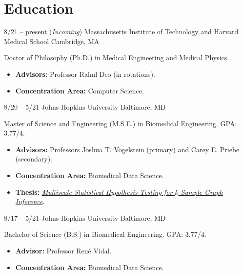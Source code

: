 \section{Education}

\cventry
{8/21 -- present (\textit{Incoming})}
{Massachusetts Institute of Technology and Harvard Medical School}
{}
{Cambridge, MA}
{}
{
Doctor of Philosophy (Ph.D.) in Medical Engineering and Medical Physics.
\begin{itemize}
    \item \textbf{Advisors:} Professor Rahul Deo (in rotations).
    \item \textbf{Concentration Area:} Computer Science.
\end{itemize}
}


\cventry
{8/20 -- 5/21}
{Johns Hopkins University}
{}
{Baltimore, MD}
{}
{
Master of Science and Engineering (M.S.E.) in Biomedical Engineering.
GPA: 3.77/4.
\begin{itemize}
    \item \textbf{Advisors:} Professors Joshua T. Vogelstein (primary) and Carey E. Priebe (secondary).
    \item \textbf{Concentration Area:} Biomedical Data Science.
    \item \textbf{Thesis:} \textit{\href{https://jscholarship.library.jhu.edu/handle/1774.2/64239}{Multiscale Statistical Hypothesis Testing for $k$-Sample Graph Inference}}.
\end{itemize}
}

\cventry
{8/17 -- 5/21}
{Johns Hopkins University}
{}
{Baltimore, MD}
{}
{
Bachelor of Science (B.S.) in Biomedical Engineering.
GPA: 3.77/4.
\begin{itemize}
    \item \textbf{Advisor:} Professor Ren\'{e} Vidal.
    \item \textbf{Concentration Area:} Biomedical Data Science.
\end{itemize}
}
